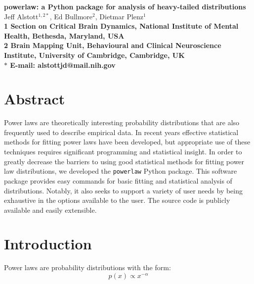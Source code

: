 \documentclass[10pt]{article}
\date{}
\begin{document}
 
 \begin{flushleft}
 {\Large
 \textbf{powerlaw: a Python package for analysis of heavy-tailed distributions}
 }
 \\
 Jeff Alstott$^{1,2\ast}$, Ed Bullmore$^{2}$, Dietmar Plenz$^{1}$
 \\
\bf{1} Section on Critical Brain Dynamics, National Institute of Mental Health, Bethesda, Maryland, USA
 \\
\bf{2} Brain Mapping Unit, Behavioural and Clinical Neuroscience Institute, University of Cambridge, Cambridge, UK
 \\
 $\ast$ E-mail: alstottjd@mail.nih.gov
 \end{flushleft}
 
 \section*{Abstract}
 Power laws are theoretically interesting probability distributions that are also frequently used to describe empirical data. In recent years effective statistical methods for fitting power laws have been developed, but appropriate use of these techniques requires significant programming and statistical insight. In order to greatly decrease the barriers to using good statistical methods for fitting power law distributions, we developed the \verb$powerlaw$ Python package. This software package provides easy commands for basic fitting and statistical analysis of distributions. Notably, it also seeks to support a variety of user needs by being exhaustive in the options available to the user. The source code is publicly available and easily extensible.
 
 \section*{Introduction}
 Power laws are probability distributions with the form:
 \begin{equation}
 p(x) \propto x^{-\alpha}
 \end{equation}
 
\end{document}
